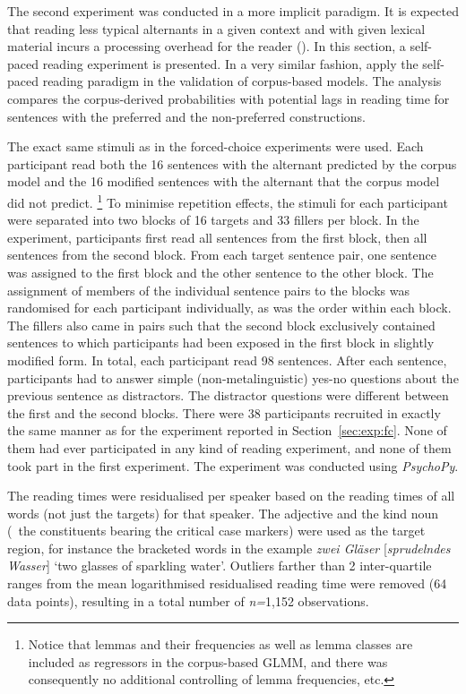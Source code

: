 The second experiment was conducted in a more implicit paradigm.
It is expected that reading less typical alternants in a given context and with given lexical material incurs a processing overhead for the reader (\citealp{Kaiser2013}).
In this section, a self-paced reading experiment is presented.
In a very similar fashion, \cite{DivjakEa2016} apply the self-paced reading paradigm in the validation of corpus-based models.
The analysis compares the corpus-derived probabilities with potential lags in reading time for sentences with the preferred and the non-preferred constructions.

The exact same stimuli as in the forced-choice experiments were used.
Each participant read both the 16 sentences with the alternant predicted by the corpus model and the 16 modified sentences with the alternant that the corpus model did not predict.%
\footnote{Notice that lemmas and their frequencies as well as lemma classes are included as regressors in the corpus-based GLMM, and there was consequently no additional controlling of lemma frequencies, etc.}
To minimise repetition effects, the stimuli for each participant were separated into two blocks of 16 targets and 33 fillers per block.
In the experiment, participants first read all sentences from the first block, then all sentences from the second block.
From each target sentence pair, one sentence was assigned to the first block and the other sentence to the other block.
The assignment of members of the individual sentence pairs to the blocks was randomised for each participant individually, as was the order within each block.
The fillers also came in pairs such that the second block exclusively contained sentences to which participants had been exposed in the first block in slightly modified form.
In total, each participant read 98 sentences.
After each sentence, participants had to answer simple (non-metalinguistic) yes-no questions about the previous sentence as distractors.
The distractor questions were different between the first and the second blocks.
There were 38 participants recruited in exactly the same manner as for the experiment reported in Section~\ref{sec:exp:fc}.
None of them had ever participated in any kind of reading experiment, and none of them took part in the first experiment.
The experiment was conducted using \textit{PsychoPy}.

The reading times were residualised per speaker based on the reading times of all words (not just the targets) for that speaker.
The adjective and the kind noun (\ie\ the constituents bearing the critical case markers) were used as the target region, for instance the bracketed words in the example \textit{zwei Gläser} [\textit{spru\-deln\-des Wasser}] `two glasses of sparkling water'.
Outliers farther than 2 inter-quartile ranges from the mean logarithmised residualised reading time were removed (64 data points), resulting in a total number of \textit{n=}1,152 observations.

